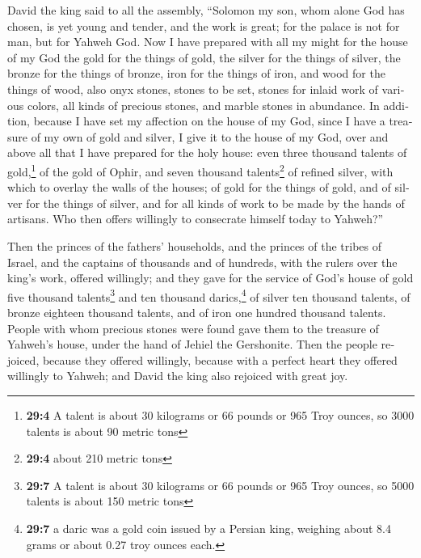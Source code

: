 \begin{paracol}{2}
\begin{otherlanguage}{english}
 David the king said to all the assembly, ``Solomon my
son, whom alone God has chosen, is yet young and tender, and the work is
great; for the palace is not for man, but for Yahweh God. 
Now I have prepared with all my might for the house of my God the gold
for the things of gold, the silver for the things of silver, the bronze
for the things of bronze, iron for the things of iron, and wood for the
things of wood, also onyx stones, stones to be set, stones for inlaid
work of various colors, all kinds of precious stones, and marble stones
in abundance.  In addition, because I have set my
affection on the house of my God, since I have a treasure of my own of
gold and silver, I give it to the house of my God, over and above all
that I have prepared for the holy house:  even three
thousand talents of gold,\footnote{\textbf{29:4} A talent is about 30
  kilograms or 66 pounds or 965 Troy ounces, so 3000 talents is about 90
  metric tons} of the gold of Ophir, and seven thousand
talents\footnote{\textbf{29:4} about 210 metric tons} of refined silver,
with which to overlay the walls of the houses;  of gold
for the things of gold, and of silver for the things of silver, and for
all kinds of work to be made by the hands of artisans. Who then offers
willingly to consecrate himself today to Yahweh?''

 Then the princes of the fathers' households, and the
princes of the tribes of Israel, and the captains of thousands and of
hundreds, with the rulers over the king's work, offered willingly;
 and they gave for the service of God's house of gold five
thousand talents\footnote{\textbf{29:7} A talent is about 30 kilograms
  or 66 pounds or 965 Troy ounces, so 5000 talents is about 150 metric
  tons} and ten thousand darics,\footnote{\textbf{29:7} a daric was a
  gold coin issued by a Persian king, weighing about 8.4 grams or about
  0.27 troy ounces each.} of silver ten thousand talents, of bronze
eighteen thousand talents, and of iron one hundred thousand talents.
 People with whom precious stones were found gave them to
the treasure of Yahweh's house, under the hand of Jehiel the Gershonite.
 Then the people rejoiced, because they offered willingly,
because with a perfect heart they offered willingly to Yahweh; and David
the king also rejoiced with great joy.


\end{otherlanguage}
\end{paracol}
